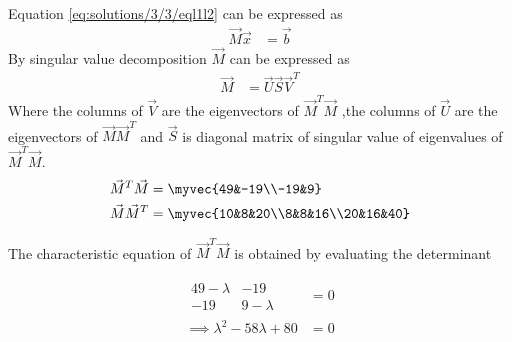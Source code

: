Equation \eqref{eq:solutions/3/3/eql1l2} can be expressed as 
\begin{align}
    \vec{M}\vec{x}&=\vec{b}\label{eq:solutions/3/3/mx=b}
\end{align}
By singular value decomposition $\vec{M}$
can be expressed as 
\begin{align}
    \vec{M}&=\vec{U}\vec{S}\vec{V}^T\label{eq:solutions/3/3/main}
\end{align}
Where the columns of $\vec{V}$ are the eigenvectors of $\vec{M}^T\vec{M}$ ,the columns of $\vec{U}$ are the eigenvectors of $\vec{M}\vec{M}^T$ and $\vec{S}$ is diagonal matrix of singular value of eigenvalues of $\vec{M}^T\vec{M}$.
\begin{align}
\vec{M}^T\vec{M}&=\myvec{49&-19\\-19&9}\label{eq:solutions/3/3/2.0.6}\\
\vec{M}\vec{M}^T&=\myvec{10&8&20\\8&8&16\\20&16&40}
\end{align}

The characteristic equation of $\vec{M}^T\vec{M}$ is obtained by evaluating the determinant 

\begin{align}
   \begin{array}{|cc|}
49-\lambda & -19 \\ -19 & 9-\lambda
\end{array}&=0\\
\implies \lambda^2-58\lambda+80&=0\label{eq:solutions/3/3/eqroots}
\end{align}

